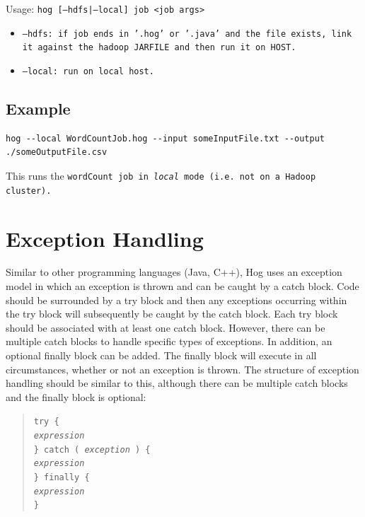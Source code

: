 \documentclass{article}
\begin{document}
Usage: \tt hog [--hdfs|--local] job <job args> \rm
\begin{itemize}
  \item[] \tt --hdfs\rm: if job ends in '.hog' or '.java' and the file exists, link it against the hadoop JARFILE and then run it on HOST.
  \item[] \tt --local\rm: run on local host.
\end{itemize}

\subsection{Example} %
\label{sub:example}

\begin{verbatim}
hog --local WordCountJob.hog --input someInputFile.txt --output ./someOutputFile.csv
\end{verbatim}

This runs the \tt wordCount \rm job in \emph{local} mode (i.e. not on a Hadoop
cluster).



\section{Exception Handling} %
\label{sec:exception_handling}

Similar to other programming languages (Java, C++), Hog uses an exception model in
which an exception is thrown and can be caught by a catch block. Code should be
surrounded by a try block and then any exceptions occurring within the try block
will subsequently be caught by the catch block. Each try block should be
associated with at least one catch block. However, there can be multiple catch
blocks to handle specific types of exceptions. In addition, an optional finally
block can be added. The finally block will execute in all circumstances, whether
or not an exception is thrown. The structure of exception handling should be
similar to this, although there can be multiple catch blocks and the finally block
is optional:

\begin{quotation}
\tt try \{ \rm \\
\indent \indent \emph{expression} \\
\tt \indent \} catch ( \rm \emph{exception} \tt ) \rm \{ \\
\indent \indent \emph{expression} \\
\tt \indent \} finally \rm \{ \\
\indent \indent \emph{expression} \\
\tt \indent \}
\end{quotation}
\end{document}
